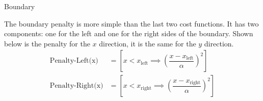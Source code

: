 \documentclass[9pt]{extarticle}
\begin{document}
\begin{homeworkProblem}
\begin{homeworkSection}{Boundary}

    The boundary penalty is more simple than the last two cost functions. It has two components: one for the left and one for the right sides of the boundary. Shown below is the penalty for the $x$ direction, it is the same for the $y$ direction. 
     \begin{align*}
            \textrm{Penalty-Left(x)} &= \left[ x < x_{\textrm{left}} \implies \left(\dfrac{x-x_{\textrm{left}}}{\alpha}\right)^2\right]\\
            \textrm{Penalty-Right(x)} &= \left[ x < x_{\textrm{right}} \implies \left(\dfrac{x-x_{\textrm{right}}}{\alpha}\right)^2\right]
     \end{align*}
\end{homeworkSection}
    
\end{homeworkProblem}
\end{document}
